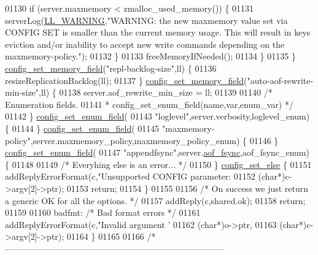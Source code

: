 \begin{DoxyCode}
{{{{{{{{01130             \textcolor{keywordflow}{if} (server.maxmemory < zmalloc\_used\_memory()) \{
01131                 serverLog(\hyperlink{server_8h_a31229b9334bba7d6be2a72970967a14b}{LL\_WARNING},\textcolor{stringliteral}{"WARNING: the new maxmemory value set via CONFIG SET is
       smaller than the current memory usage. This will result in keys eviction and/or inability to accept new
       write commands depending on the maxmemory-policy."});
01132             \}
01133             freeMemoryIfNeeded();
01134         \}
01135     \} \hyperlink{config_8c_ae9b891f5f43617ea158d55f449285b7d}{config\_set\_memory\_field}(\textcolor{stringliteral}{"repl-backlog-size"},ll) \{
01136         resizeReplicationBacklog(ll);
01137     \} \hyperlink{config_8c_ae9b891f5f43617ea158d55f449285b7d}{config\_set\_memory\_field}(\textcolor{stringliteral}{"auto-aof-rewrite-min-size"},ll) \{
01138         server.aof\_rewrite\_min\_size = ll;
01139 
01140     \textcolor{comment}{/* Enumeration fields.}
01141 \textcolor{comment}{     * config\_set\_enum\_field(name,var,enum\_var) */}
01142     \} \hyperlink{config_8c_a57a2639202841d0e66af977ef0f3bc66}{config\_set\_enum\_field}(
01143       \textcolor{stringliteral}{"loglevel"},server.verbosity,loglevel\_enum) \{
01144     \} \hyperlink{config_8c_a57a2639202841d0e66af977ef0f3bc66}{config\_set\_enum\_field}(
01145       \textcolor{stringliteral}{"maxmemory-policy"},server.maxmemory\_policy,maxmemory\_policy\_enum) \{
01146     \} \hyperlink{config_8c_a57a2639202841d0e66af977ef0f3bc66}{config\_set\_enum\_field}(
01147       \textcolor{stringliteral}{"appendfsync"},server.\hyperlink{config_8h_af5994c643c434574580bb7816af82cad}{aof\_fsync},aof\_fsync\_enum) \{
01148 
01149     \textcolor{comment}{/* Everyhing else is an error... */}
01150     \} \hyperlink{config_8c_acf8c5da6434cc641a95acc8fca27b971}{config\_set\_else} \{
01151         addReplyErrorFormat(c,\textcolor{stringliteral}{"Unsupported CONFIG parameter: %
01152             (\textcolor{keywordtype}{char}*)c->argv[2]->ptr);
01153         \textcolor{keywordflow}{return};
01154     \}
01155 
01156     \textcolor{comment}{/* On success we just return a generic OK for all the options. */}
01157     addReply(c,shared.ok);
01158     \textcolor{keywordflow}{return};
01159 
01160 badfmt: \textcolor{comment}{/* Bad format errors */}
01161     addReplyErrorFormat(c,\textcolor{stringliteral}{"Invalid argument '%
01162             (\textcolor{keywordtype}{char}*)o->ptr,
01163             (\textcolor{keywordtype}{char}*)c->argv[2]->ptr);
01164 \}
01165 
01166 \textcolor{comment}{/*-----------------------------------------------------------------------------}
}}}}}}}}}}
\end{DoxyCode}
